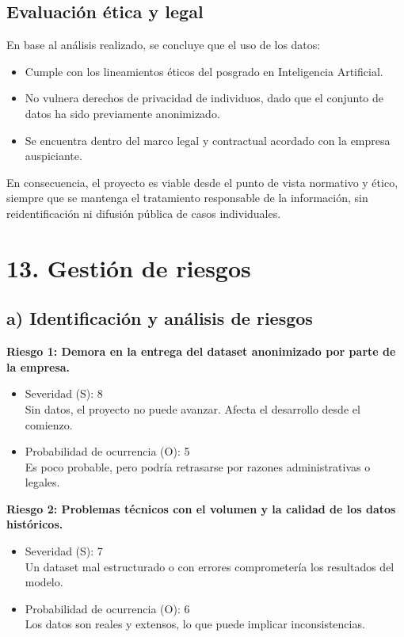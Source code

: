\documentclass[
11pt, %
]{charter}
\begin{document}
\subsection*{Evaluación ética y legal}

En base al análisis realizado, se concluye que el uso de los datos:

\begin{itemize}
    \item Cumple con los lineamientos éticos del posgrado en Inteligencia Artificial.
    \item No vulnera derechos de privacidad de individuos, dado que el conjunto de datos ha sido previamente anonimizado.
    \item Se encuentra dentro del marco legal y contractual acordado con la empresa auspiciante.
\end{itemize}

En consecuencia, el proyecto es viable desde el punto de vista normativo y ético, siempre que se mantenga el tratamiento responsable de la información, sin reidentificación ni difusión pública de casos individuales.

\section{13. Gestión de riesgos}
\label{sec:riesgos}

\subsection*{a) Identificación y análisis de riesgos}

\textbf{Riesgo 1: Demora en la entrega del dataset anonimizado por parte de la empresa.}
\begin{itemize}
  \item Severidad (S): 8 \\
  Sin datos, el proyecto no puede avanzar. Afecta el desarrollo desde el comienzo.
  \item Probabilidad de ocurrencia (O): 5 \\
  Es poco probable, pero podría retrasarse por razones administrativas o legales.
\end{itemize}

\textbf{Riesgo 2: Problemas técnicos con el volumen y la calidad de los datos históricos.}
\begin{itemize}
  \item Severidad (S): 7 \\
  Un dataset mal estructurado o con errores comprometería los resultados del modelo.
  \item Probabilidad de ocurrencia (O): 6 \\
  Los datos son reales y extensos, lo que puede implicar inconsistencias.
\end{itemize}
\end{document}
